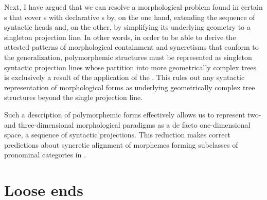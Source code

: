 \par 
Next, I have argued that we can resolve a morphological  problem found in certain  s that cover s with declarative s by, on the one hand, extending the sequence of syntactic heads  and, on the other, by simplifying its underlying geometry to a singleton projection line. In other words, in order to be able to derive the attested patterns of morphological containment and syncretisms that conform to the  generalization, polymorphemic structures must be represented as singleton syntactic projection lines whose partition into more geometrically complex trees is exclusively a result of the application of the . This rules out any syntactic representation of morphological forms as underlying geometrically complex tree structures beyond the single projection line.
\par
Such a description of polymorphemic forms effectively allows us to represent two- and three-dimensional morphological paradigms as a de facto one-dimensional space, a sequence of syntactic projections. This reduction makes correct predictions about syncretic alignment of  morphemes forming subclasses of pronominal categories in .

\section{Loose ends}

